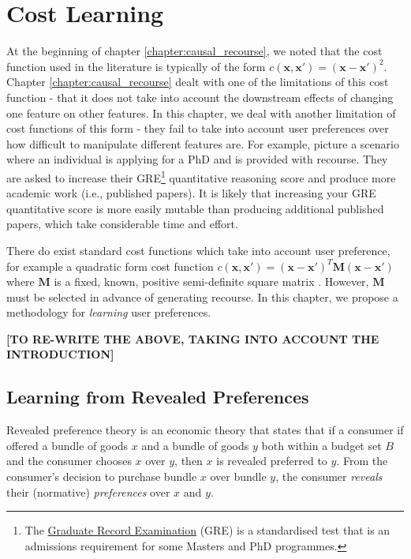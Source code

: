 \chapter{Cost Learning} \label{chapter:cost_learning}

At the beginning of chapter \ref{chapter:causal_recourse}, we noted that the cost function used in the literature is typically of the form $c(\boldsymbol{x}, \boldsymbol{x}') = (\boldsymbol{x} - \boldsymbol{x}')^2$. Chapter \ref{chapter:causal_recourse} dealt with one of the limitations of this cost function - that it does not take into account the downstream effects of changing one feature on other features. In this chapter, we deal with another limitation of cost functions of this form - they fail to take into account user preferences over how difficult to manipulate different features are. For example, picture a scenario where an individual is applying for a PhD and is provided with recourse. They are asked to increase their GRE\footnote{The \href{https://www.ets.org/gre.html}{Graduate Record Examination} (GRE) is a standardised test that is an admissions requirement for some Masters and PhD programmes.} quantitative reasoning score and produce more academic work (i.e., published papers). It is likely that increasing your GRE quantitative score is more easily mutable than producing additional published papers, which take considerable time and effort.

There do exist standard cost functions which take into account user preference, for example a quadratic form cost function $c(\boldsymbol{x}, \boldsymbol{x}') = (\mathbf{x-x'})^T\mathbf{M}(\mathbf{x-x'})$ where $\mathbf{M}$ is a fixed, known, positive semi-definite square matrix \citep{bechavodInformationDiscrepancyStrategic2022}. However, $\mathbf{M}$ must be selected in advance of generating recourse. In this chapter, we propose a methodology for \textit{learning} user preferences.

\textbf{[TO RE-WRITE THE ABOVE, TAKING INTO ACCOUNT THE INTRODUCTION]}


\section{Learning from Revealed Preferences}

Revealed preference theory \citep{samuelsonNotePureTheory1938, samuelsonConsumptionTheoryTerms1948} is an economic theory that states that if a consumer if offered a bundle of goods $x$ and a bundle of goods $y$ both within a budget set $B$ and the consumer chooses $x$ over $y$, then $x$ is revealed preferred to $y$. From the consumer's decision to purchase bundle $x$ over bundle $y$, the consumer \textit{reveals} their (normative) \textit{preferences} over $x$ and $y$.

